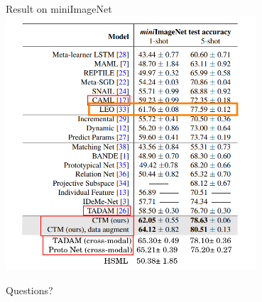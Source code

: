 \documentclass{beamer}
\begin{document}
\begin{frame}{Result on miniImageNet}
  \center \includegraphics[width=0.7\textwidth]{fig/LEO-result.png}
\end{frame}

\begin{frame}
	\begin{center}
    \LARGE{Questions?}
	\end{center}
\end{frame}
\end{document}
